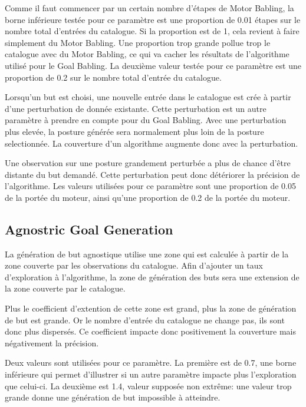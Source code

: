 \documentclass[11pt,french]{report}
\begin{document}
Comme il faut commencer par un certain nombre d'étapes de Motor Babling, la borne inférieure testée pour ce paramètre est une proportion de 0.01 étapes sur le nombre total d'entrées du catalogue.
Si la proportion est de 1, cela revient à faire simplement du Motor Babling. Une proportion trop grande pollue trop le catalogue avec du Motor Babling, ce qui va cacher les résultats de l'algorithme utilisé pour le Goal Babling.
La deuxième valeur testée pour ce paramètre est une proportion de 0.2 sur le nombre total d'entrée du catalogue.

\phantom{INVISIBLE LINE}

Lorsqu'un but est choisi, une nouvelle entrée dans le catalogue est crée à partir d'une perturbation de donnée existante.
Cette perturbation est un autre paramètre à prendre en compte pour du Goal Babling.
Avec une perturbation plus elevée, la posture générée sera normalement plus loin de la posture selectionnée.
La couverture d'un algorithme augmente donc avec la perturbation.

Une observation sur une posture grandement perturbée a plus de chance d'être distante du but demandé.
Cette perturbation peut donc détériorer la précision de l'algorithme.
Les valeurs utilisées pour ce paramètre sont une proportion de 0.05 de la portée du moteur, ainsi qu'une proportion de 0.2 de la portée du moteur.

\subsection{Agnostric Goal Generation}

La génération de but agnostique utilise une zone qui est calculée à partir de la zone couverte par les observations du catalogue.
Afin d'ajouter un taux d'exploration à l'algorithme, la zone de génération des buts sera une extension de la zone couverte par le catalogue.

Plus le coefficient d'extention de cette zone est grand, plus la zone de génération de but est grande.
Or le nombre d'entrée du catalogue ne change pas, ils sont donc plus dispersés.
Ce coefficient impacte donc positivement la couverture mais négativement la précision.

\phantom{INVISIBLE LINE}

Deux valeurs sont utilisées pour ce paramètre.
La première est de 0.7, une borne inférieure qui permet d'illustrer si un autre paramètre impacte plus l'exploration que celui-ci.
La deuxième est 1.4, valeur supposée non extrême: une valeur trop grande donne une génération de but impossible à atteindre.
\end{document}
